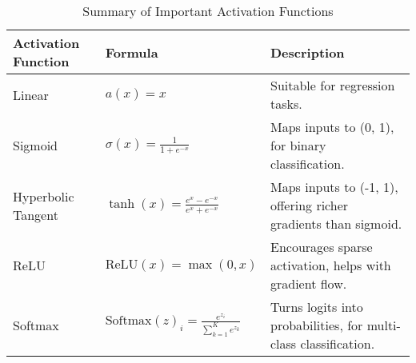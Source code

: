 \begin{table}[htb!]
\caption{Summary of Important Activation Functions}
\label{Table:ActivationFunctions}
\centering
\footnotesize
\begin{tabularx}{\textwidth}{@{}lXl@{}}
\toprule
\textbf{Activation Function} & \textbf{Formula} & \textbf{Description} \\
\midrule
Linear & \( a(x) = x \) & Suitable for regression tasks. \\
\addlinespace
Sigmoid & \( \sigma(x) = \frac{1}{1 + e^{-x}} \) & Maps inputs to (0, 1), for binary classification. \\
\addlinespace
Hyperbolic Tangent & \( \tanh(x) = \frac{e^{x} - e^{-x}}{e^{x} + e^{-x}} \) & Maps inputs to (-1, 1), offering richer gradients than sigmoid. \\
\addlinespace
ReLU & \( \text{ReLU}(x) = \max(0, x) \) & Encourages sparse activation, helps with gradient flow. \\
\addlinespace
Softmax & \( \text{Softmax}(z)_i = \frac{e^{z_i}}{\sum_{k=1}^K e^{z_k}} \) & Turns logits into probabilities, for multi-class classification. \\
\bottomrule
\end{tabularx}
\end{table}
